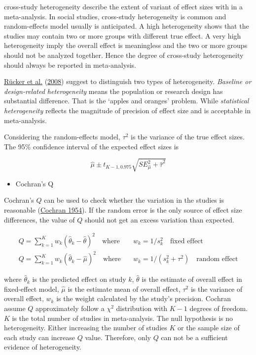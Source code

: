 \documentclass[
  11pt,
  openany]{memoir}
\providecommand{\tightlist}{%
  \setlength{\itemsep}{0pt}\setlength{\parskip}{0pt}}
\begin{document}
cross-study heterogeneity describe the extent of variant of effect sizes with in a meta-analysis.
In social studies, cross-study heterogeneity is common and random-effects model usually is anticipated.
A high heterogeneity shows that the studies may contain two or more groups with different true effect.
A very high heterogeneity imply the overall effect is meaningless and the two or more groups should not be analyzed together.
Hence the degree of cross-study heterogeneity should always be reported in meta-analysis.

\protect\hyperlink{ref-ruckerUndueRelianceI22008}{Rücker et al.} (\protect\hyperlink{ref-ruckerUndueRelianceI22008}{2008}) suggest to distinguish two types of heterogeneity.
\emph{Baseline or design-related heterogeneity} means the population or research design has substantial difference. That is the `apples and oranges' problem.
While \emph{statistical heterogeneity} reflects the magnitude of precision of effect size and is acceptable in meta-analysis.

Considering the random-effects model, \(\tau^2\) is the variance of the true effect sizes.
The 95\% confidence interval of the expected effect sizes is

\begin{equation}
\hat\mu \pm t_{K-1, 0.975}\sqrt{SE_{\hat\mu}^2+\hat\tau^2}
\end{equation}

\begin{itemize}
\tightlist
\item
  Cochran's Q
\end{itemize}

Cochran's \(Q\) can be used to check whether the variation in the studies is reasonable (\protect\hyperlink{ref-cochranMethodsStrengtheningCommon1954}{Cochran 1954}).
If the random error is the only source of effect size differences, the value of \(Q\) should not get an excess variation than expected.

\begin{equation}
\begin{split}
Q = \sum^K_{k=1}w_k(\hat\theta_k-\hat\theta)^2\quad\text{where}&\quad w_k=1/s^2_k\quad\text{fixed effect}\\
Q = \sum_{k=1}^{K} w_k (\hat\theta_k-\hat\mu)^2\quad\text{where}&\quad w_k=1/(s^2_k+\tau^2)\quad\text{random effect}
\end{split}
\end{equation}

where \(\hat\theta_k\) is the predicted effect on study \(k\), \(\hat\theta\) is the estimate of overall effect in fixed-effect model, \(\hat\mu\) is the estimate mean of overall effect, \(\tau^2\) is the variance of overall effect, \(w_k\) is the weight calculated by the study's precision.
Cochran assume \(Q\) approximately follow a \(\chi^2\) distribution with \(K-1\) degrees of freedom. \(K\) is the total number of studies in meta-analysis. The null hypothesis is no heterogeneity.
Either increasing the number of studies \(K\) or the sample size of each study can increase \(Q\) value.
Therefore, only \(Q\) can not be a sufficient evidence of heterogeneity.
\end{document}
